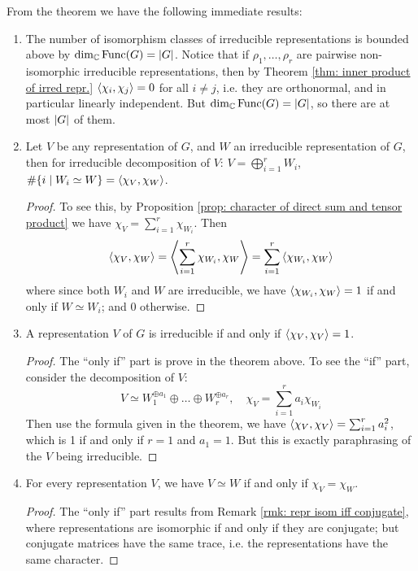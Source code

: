 \documentclass{article}
\begin{document}
\begin{corollary}\label{cor: inner prod. of repr.}
    From the theorem we have the following immediate results:
    \begin{enumerate}[label=\arabic*)]
        \item The number of isomorphism classes of irreducible representations is bounded above by $\dim_{\mathbb{C}} \mathrm{Func}(G) = \left|G\right|$. Notice that if $\rho_1, \dots, \rho_r$ are pairwise non-isomorphic irreducible representations, then by Theorem \ref{thm: inner product of irred repr.} $\left\langle \chi_i, \chi_j \right\rangle = 0$ for all $i \neq j$, i.e. they are orthonormal, and in particular linearly independent. But $\dim_{\mathbb{C}} \mathrm{Func}(G) = \left|G\right|$, so there are at most $\left|G\right|$ of them. 
        \item Let $V$ be any representation of $G$, and $W$ an irreducible representation of $G$, then for irreducible decomposition of $V$: $V = \bigoplus_{i = 1}^r W_i$, $\#\{ i \mid W_i \simeq W \} = \left\langle \chi_V, \chi_W \right\rangle$. 
        \begin{proof}
            To see this, by Proposition \ref{prop: character of direct sum and tensor product} we have $\chi_V = \sum_{i = 1}^r \chi_{W_i}$. Then
            \[
                \left\langle \chi_V, \chi_W \right\rangle = \left\langle \sum_{i = 1}^r \chi_{W_i}, \chi_W \right\rangle = \sum_{i = 1}^r \left\langle \chi_{W_i}, \chi_W \right\rangle
                \]
                where since both $W_i$ and $W$ are irreducible, we have $\left\langle \chi_{W_i}, \chi_W \right\rangle = 1$ if and only if $W \simeq W_i$; and 0 otherwise.
        \end{proof}
        \item A representation $V$ of $G$ is irreducible if and only if $\left\langle \chi_V, \chi_V \right\rangle = 1$.
        \begin{proof}
            The ``only if'' part is prove in the theorem above. To see the ``if'' part, consider the decomposition of $V$:
            \[
                V \simeq W_1^{\oplus a_1} \oplus \dots \oplus W_r^{\oplus a_r}, \quad \chi_V = \sum_{i = 1}^r a_i \chi_{W_i}
            \]
            Then use the formula given in the theorem, we have $\left\langle \chi_V, \chi_V \right\rangle = \sum_{i = 1}^r a_i^2$, which is 1 if and only if $r = 1$ and $a_1 = 1$. But this is exactly paraphrasing of the $V$ being irreducible.
        \end{proof}
        \item For every representation $V$, we have $V \simeq W$ if and only if $\chi_V = \chi_W$.
        \begin{proof}
            The ``only if'' part results from Remark \ref{rmk: repr isom iff conjugate}, where representations are isomorphic if and only if they are conjugate; but conjugate matrices have the same trace, i.e. the representations have the same character.


\end{proof}
\end{enumerate}
\end{corollary}
\end{document}

